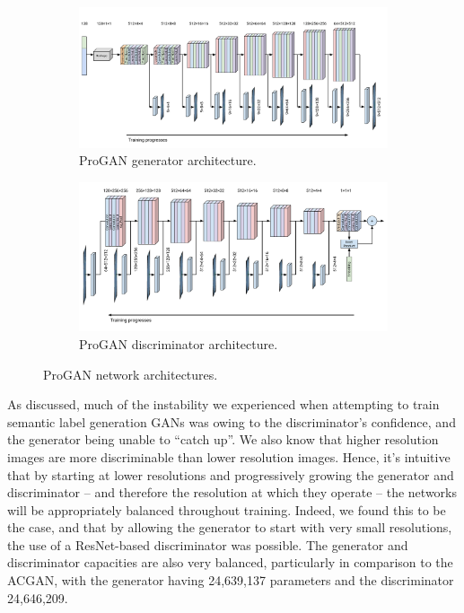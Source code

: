\begin{figure}[h]
    \centering
    \begin{subfigure}{\textwidth}
        \centering
        \includegraphics[width=\linewidth]{labels/figs/progan-generator.pdf}
        \caption{ProGAN generator architecture.}
        \label{fig:progan_gen}
    \end{subfigure}
    \begin{subfigure}{\textwidth}
        \centering
        \includegraphics[width=\linewidth]{labels/figs/progan-discriminator.pdf}
        \caption{ProGAN discriminator architecture.}
        \label{fig:progan_dis}
    \end{subfigure}
    \caption{ProGAN network architectures.}
    \label{fig:progan_arch}
\end{figure}

As discussed, much of the instability we experienced when attempting to train semantic label generation GANs was owing to the discriminator's confidence, and the generator being unable to ``catch up''.
We also know that higher resolution images are more discriminable than lower resolution images.
Hence, it's intuitive that by starting at lower resolutions and progressively growing the generator and discriminator -- and therefore the resolution at which they operate -- the networks will be appropriately balanced throughout training.
Indeed, we found this to be the case, and that by allowing the generator to start with very small resolutions, the use of a ResNet-based discriminator was possible.
The generator and discriminator capacities are also very balanced, particularly in comparison to the ACGAN, with the generator having 24,639,137 parameters and the discriminator 24,646,209.


